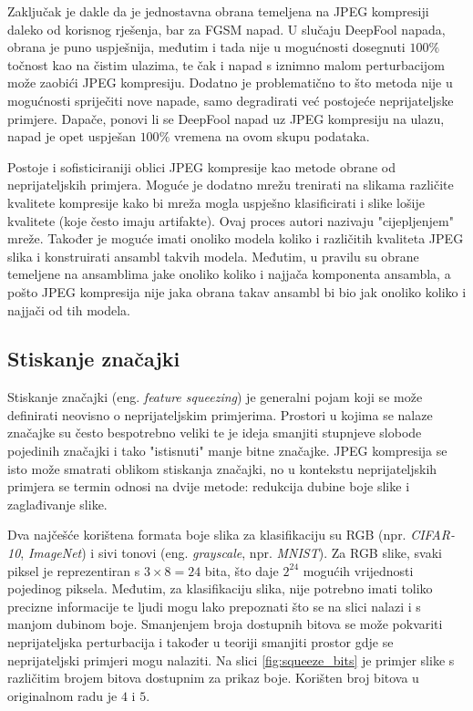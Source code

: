 \documentclass[utf8, diplomski]{fer}
\begin{document}
Zaključak je dakle da je jednostavna obrana temeljena na JPEG kompresiji daleko od korisnog rješenja, bar za FGSM napad. U slučaju DeepFool napada, obrana je puno uspješnija, međutim i tada nije u mogućnosti dosegnuti $100\%$ točnost kao na čistim ulazima, te čak i napad s iznimno malom perturbacijom može zaobići JPEG kompresiju. Dodatno je problematično to što metoda nije u mogućnosti spriječiti nove napade, samo degradirati već postojeće neprijateljske primjere. Dapače, ponovi li se DeepFool napad uz JPEG kompresiju na ulazu, napad je opet uspješan $100\%$ vremena na ovom skupu podataka. 
\par
Postoje i sofisticiraniji oblici JPEG kompresije kao metode obrane\citep{jpeg2} od neprijateljskih primjera. Moguće je dodatno mrežu trenirati na slikama različite kvalitete kompresije kako bi mreža mogla uspješno klasificirati i slike lošije kvalitete (koje često imaju artifakte). Ovaj proces autori nazivaju "cijepljenjem" mreže. Također je moguće imati onoliko modela koliko i različitih kvaliteta JPEG slika i konstruirati ansambl takvih modela. Međutim, u pravilu su obrane temeljene na ansamblima jake onoliko koliko i najjača komponenta ansambla, a pošto JPEG kompresija nije jaka obrana takav ansambl bi bio jak onoliko koliko i najjači od tih modela.

\subsection{Stiskanje značajki}
Stiskanje značajki\citep{squeezing} (eng. \textit{feature squeezing}) je generalni pojam koji se može definirati neovisno o neprijateljskim primjerima. Prostori u kojima se nalaze značajke su često bespotrebno veliki te je ideja smanjiti stupnjeve slobode pojedinih značajki i tako "istisnuti" manje bitne značajke. JPEG kompresija\label{jpeg_comp} se isto može smatrati oblikom stiskanja značajki, no u kontekstu neprijateljskih primjera se termin odnosi na dvije metode: redukcija dubine boje slike i zaglađivanje slike. \par
Dva najčešće korištena formata boje slika za klasifikaciju su RGB (npr. \textit{CIFAR-10}, \textit{ImageNet}) i sivi tonovi (eng. \textit{grayscale}, npr. \textit{MNIST}). Za RGB slike, svaki piksel je reprezentiran s $3 \times 8 = 24$ bita, što daje $2^{24}$ mogućih vrijednosti pojedinog piksela. Međutim, za klasifikaciju slika, nije potrebno imati toliko precizne informacije te ljudi mogu lako prepoznati što se na slici nalazi i s manjom dubinom boje. Smanjenjem broja dostupnih bitova se može pokvariti neprijateljska perturbacija i također u teoriji smanjiti prostor gdje se neprijateljski primjeri mogu nalaziti. Na slici \ref{fig:squeeze_bits} je primjer slike s različitim brojem bitova dostupnim za prikaz boje. Korišten broj bitova u originalnom radu je $4$ i $5$.
\end{document}
